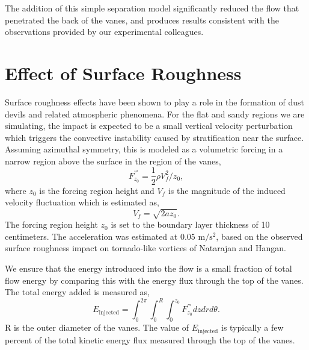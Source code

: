 
The addition of this simple separation model significantly reduced the
flow that penetrated the back of the vanes, and produces results
consistent with the observations provided by our experimental
colleagues.  

\section{Effect of Surface Roughness}


Surface roughness effects have been shown to play a role in the
formation of dust devils and related atmospheric
phenomena\cite{oke1987boundary}. For the flat and sandy
regions we are simulating, the impact is expected to be a small vertical 
velocity perturbation which triggers the convective instability caused
by stratification near the surface. 
Assuming azimuthal symmetry, this is modeled as a volumetric forcing in
a narrow region above the surface in the region of the vanes,  
\begin{equation}
 F^{'''}_{z_0} = \frac{1}{2}\rho V_f^2/z_{0}, 
\end{equation}
where $z_{0}$ is the forcing region height and $V_f$ is the magnitude of
 the  induced velocity fluctuation which is estimated as, 
\begin{equation}
V_f = \sqrt{2 a z_0}.
\end{equation}
The forcing region height $z_0$ is set to the boundary layer thickness
of 10 centimeters. The acceleration was estimated at 0.05
$\text{m}/\text{s}^2$, based on the observed surface roughness impact on
tornado-like vortices of Natarajan and Hangan\cite{Natarajan2012577}.

We ensure that the energy
introduced into the flow is a small fraction of total flow energy by comparing
this with the energy flux through the top of the vanes. The total energy
added is measured as,  
\begin{equation}
 E_{\text{injected}} = \int_0^{2\pi} \int_0^R \int_0^{z_0} F^{'''}_{z_0}
  dz dr d\theta.  
\end{equation}
R is the outer diameter of the vanes. 
The value of $E_{\text{injected}}$ is typically a few percent of the
total kinetic energy flux measured through the top of the
vanes.

